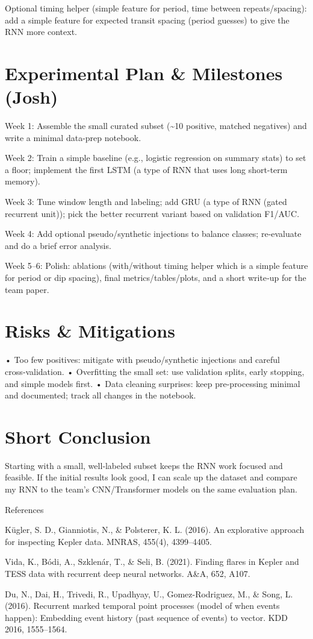 \documentclass[letterpaper]{article}
\begin{document}
Optional timing helper (simple feature for period, time between repeats/spacing): add a simple feature for expected transit spacing (period guesses) to give the RNN more context.

\section*{Experimental Plan \& Milestones (Josh)}
Week 1: Assemble the small curated subset (\textasciitilde{}10 positive, matched negatives) and write a minimal data-prep notebook.

Week 2: Train a simple baseline (e.g., logistic regression on summary stats) to set a floor; implement the first LSTM (a type of RNN that uses long short-term memory).

Week 3: Tune window length and labeling; add GRU (a type of RNN (gated recurrent unit)); pick the better recurrent variant based on validation F1/AUC.

Week 4: Add optional pseudo/synthetic injections to balance classes; re‑evaluate and do a brief error analysis.

Week 5–6: Polish: ablations (with/without timing helper which is a simple feature for period or dip spacing), final metrics/tables/plots, and a short write‑up for the team paper.

\section*{Risks \& Mitigations}
• Too few positives: mitigate with pseudo/synthetic injections and careful cross‑validation.
• Overfitting the small set: use validation splits, early stopping, and simple models first.
• Data cleaning surprises: keep pre-processing minimal and documented; track all changes in the notebook.

\section*{Short Conclusion}
Starting with a small, well‑labeled subset keeps the RNN work focused and feasible. If the initial results look good, I can scale up the dataset and compare my RNN to the team’s CNN/Transformer models on the same evaluation plan.

References

Kügler, S. D., Gianniotis, N., \& Polsterer, K. L. (2016). An explorative approach for inspecting Kepler data. MNRAS, 455(4), 4399–4405.

Vida, K., Bódi, A., Szklenár, T., \& Seli, B. (2021). Finding flares in Kepler and TESS data with recurrent deep neural networks. A\&A, 652, A107.

Du, N., Dai, H., Trivedi, R., Upadhyay, U., Gomez-Rodriguez, M., \& Song, L. (2016). Recurrent marked temporal point processes (model of when events happen): Embedding event history (past sequence of events) to vector. KDD 2016, 1555–1564.
\end{document}
